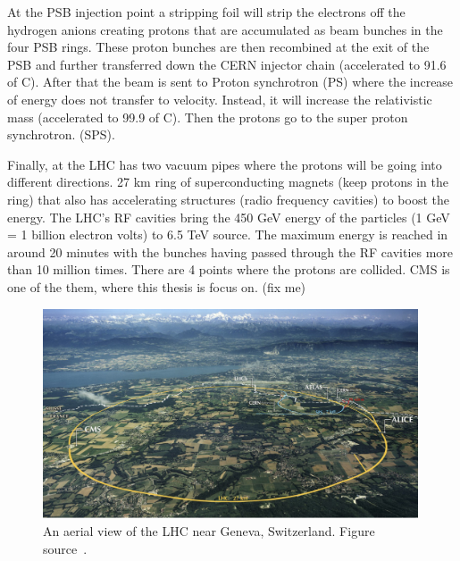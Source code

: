  At the PSB injection point a stripping foil will strip the electrons off the hydrogen anions creating protons that are accumulated as beam bunches in the four PSB rings. These proton bunches are then recombined at the exit of the PSB and further transferred down the CERN injector chain (accelerated to 91.6 of C). After that the beam is sent to Proton synchrotron (PS) where the increase of energy does not transfer to velocity. Instead, it will increase the relativistic mass (accelerated to 99.9 of C). Then the protons go to the super proton synchrotron. (SPS).

Finally, at the LHC has two vacuum pipes where the protons will be going into different directions. 27 km ring of superconducting magnets (keep protons in the ring) that also has accelerating structures (radio frequency cavities) to boost the energy. The LHC’s RF cavities bring the 450 GeV energy of the particles (1 GeV = 1 billion electron volts) to 6.5 TeV source. The maximum energy is reached in around 20 minutes with the bunches having passed through the RF cavities more than 10 million times. There are 4 points where the protons are collided. CMS is one of the them, where this thesis is focus on. (fix me) 

\begin{figure}[t!]
\centering
\includegraphics[width=0.99\textwidth]{figures/LHC_location.png}
\caption[An aerial view of the LHC near Geneva, Switzerland]{An aerial view of the LHC near Geneva, Switzerland. Figure source~\cite{SMtable}.}
\label{fig:LHC_location}
\end{figure}

